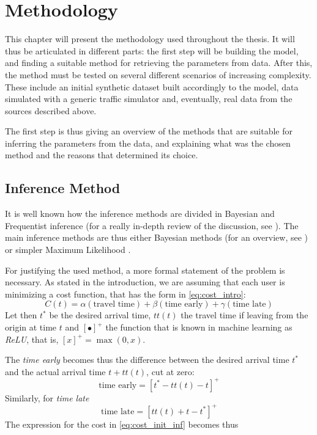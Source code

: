 \chapter{Methodology}
\label{chap:methodology}

This chapter will present the methodology used throughout the thesis.
It will thus be articulated in different parts:
the first step will be building the model,
and finding a suitable method for retrieving the parameters from data.
After this, the method must be tested on several different scenarios of increasing complexity.
These include an initial synthetic dataset built accordingly to the model,
data simulated with a generic traffic simulator and, eventually,
real data from the sources described above.

The first step is thus giving an overview of the methods that are suitable for inferring the parameters from the data,
and explaining what was the chosen method and the reasons that determined its choice.

\section{Inference Method}
\label{sec:inference}

It is well known how the inference methods are divided in Bayesian and Frequentist inference
(for a really in-depth review of the discussion, see \cite{bandyopadhyay2011philosophy}).
The main inference methods are thus either Bayesian methods (for an overview, see \cite{gelman2013bayesian}) or simpler Maximum Likelihood \parencite{doi:10.1098/rsta.1922.0009}.

For justifying the used method, a more formal statement of the problem is necessary.
As stated in the introduction, we are assuming that each user is minimizing a cost function,
that has the form in \eqref{eq:cost_intro}:
\begin{equation}
  \label{eq:cost_init_inf}
  C(t) = \alpha(\text{travel time}) + \beta (\text{time early}) + \gamma (\text{time late})
\end{equation}
Let then \(t^*\) be the desired arrival time,
\(tt(t)\) the travel time if leaving from the origin at time \(t\) and
\([\bullet]^+\) the function that is known in machine learning as \textit{ReLU}, that is,
\([x]^+ = \max(0, x)\).

The \textit{time early} becomes thus the difference between the desired arrival time \(t^*\) and the actual arrival time \(t + tt(t)\), cut at zero:
\[\text{time early} = [t^* - tt(t) - t]^+\]
Similarly, for \textit{time late}
\[\text{time late} = [tt(t) + t - t^*]^+\]
The expression for the cost in \eqref{eq:cost_init_inf} becomes thus

